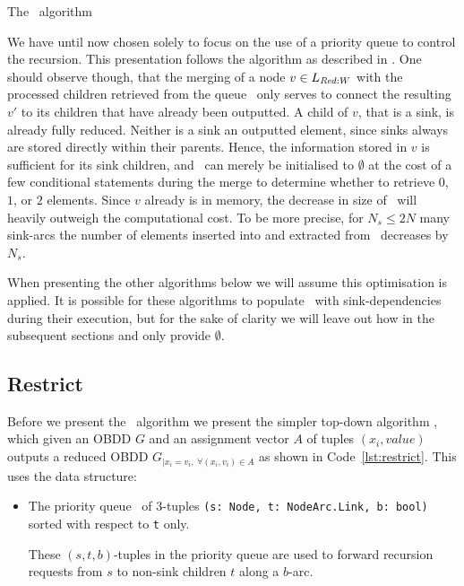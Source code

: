 \begin{lstfloat}
  \centering

  

  \caption{The \Reduce\ algorithm}
  \label{lst:reduce_algorithm}
\end{lstfloat}

\clearpage
We have until now chosen solely to focus on the use of a priority queue to
control the recursion. This presentation follows the algorithm as described in
\cite{Arge96}. One should observe though, that the merging of a node $v \in
L_{\mathit{Red:}W}$ with the processed children retrieved from the queue \ReduceQdep\
only serves to connect the resulting $v'$ to its children that have already been
outputted. A child of $v$, that is a sink, is already fully reduced. Neither is
a sink an outputted element, since sinks always are stored directly within their
parents. Hence, the information stored in $v$ is sufficient for its sink
children, and \ReduceQdep\ can merely be initialised to $\emptyset$ at the cost
of a few conditional statements during the merge to determine whether to
retrieve $0$, $1$, or $2$ elements. Since $v$ already is in memory, the decrease
in size of \ReduceQdep\ will heavily outweigh the computational cost. To be more
precise, for $N_s \leq 2N$ many sink-arcs the number of elements inserted into
and extracted from \ReduceQdep\ decreases by $N_s$.


When presenting the other algorithms below we will assume this optimisation is
applied. It is possible for these algorithms to populate \ReduceQdep\ with
sink-dependencies during their execution, but for the sake of clarity we will
leave out how in the subsequent sections and only provide $\emptyset$.

\subsection{Restrict} \label{sec:theory__restrict}
Before we present the \Apply\ algorithm we present the simpler top-down
algorithm \Restrict, which given an OBDD $G$ and an assignment vector $A$ of
tuples $(x_i, \mathit{value})$ outputs a reduced OBDD $G_{| x_i = v_i ,\ \forall
  (x_i,v_i) \in A}$ as shown in Code~\ref{lst:restrict}.  This uses the data
structure:

\begin{itemize}
\item The priority queue \RestrictQrec\ of 3-tuples
    \lstinline{(s: Node, t: NodeArc.Link, b: bool)} sorted with respect to
    \lstinline{t} only.

  These $(s,t,b)$-tuples in the priority queue are used to forward recursion
  requests from $s$ to non-sink children $t$ along a $b$-arc.
\end{itemize}

